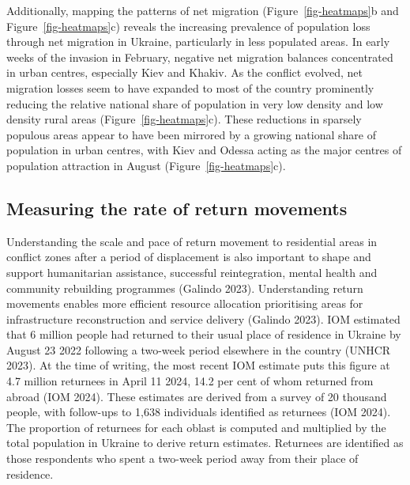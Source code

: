 \documentclass[
  sn-nature,
  11pt,
]{sn-jnl}
\begin{document}
Additionally, mapping the patterns of net migration
(Figure~\ref{fig-heatmaps}b and Figure~\ref{fig-heatmaps}c) reveals the
increasing prevalence of population loss through net migration in
Ukraine, particularly in less populated areas. In early weeks of the
invasion in February, negative net migration balances concentrated in
urban centres, especially Kiev and Khakiv. As the conflict evolved, net
migration losses seem to have expanded to most of the country
prominently reducing the relative national share of population in very
low density and low density rural areas (Figure~\ref{fig-heatmaps}c).
These reductions in sparsely populous areas appear to have been mirrored
by a growing national share of population in urban centres, with Kiev
and Odessa acting as the major centres of population attraction in
August (Figure~\ref{fig-heatmaps}c).

\subsection{Measuring the rate of return movements}\label{sec-return}

Understanding the scale and pace of return movement to residential areas
in conflict zones after a period of displacement is also important to
shape and support humanitarian assistance, successful reintegration,
mental health and community rebuilding programmes (Galindo 2023).
Understanding return movements enables more efficient resource
allocation prioritising areas for infrastructure reconstruction and
service delivery (Galindo 2023). IOM estimated that 6 million people had
returned to their usual place of residence in Ukraine by August 23 2022
following a two-week period elsewhere in the country (UNHCR 2023). At
the time of writing, the most recent IOM estimate puts this figure at
4.7 million returnees in April 11 2024, 14.2 per cent of whom returned
from abroad (IOM 2024). These estimates are derived from a survey of 20
thousand people, with follow-ups to 1,638 individuals identified as
returnees (IOM 2024). The proportion of returnees for each oblast is
computed and multiplied by the total population in Ukraine to derive
return estimates. Returnees are identified as those respondents who
spent a two-week period away from their place of residence.
\end{document}
